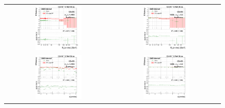 \begin{figure}[bh]
  \begin{center}
    \begin{tabular}{cc}
      \includegraphics[width=0.45\textwidth]{figures/Zprime/2017/ScaleFactor/SameSign/RunF/N-1/g_compare_cut_Et_Barrel_ea_ta_inc_AS_N_1_EcalDriven_PUW_F.png} &
      \includegraphics[width=0.45\textwidth]{figures/Zprime/2017/ScaleFactor/SameSign/RunF/N-1/g_compare_cut_Et_Endcap_ea_ta_inc_AS_N_1_EcalDriven_PUW_F.png} \\
      \includegraphics[width=0.45\textwidth]{figures/Zprime/2017/ScaleFactor/SameSign/RunF/N-1/g_compare_cut_phi_Barrel_ea_ta_inc_AS_N_1_EcalDriven_PUW_F.png} &
      \includegraphics[width=0.45\textwidth]{figures/Zprime/2017/ScaleFactor/SameSign/RunF/N-1/g_compare_cut_phi_Endcap_ea_ta_inc_AS_N_1_EcalDriven_PUW_F.png} \\

\end{tabular}
\end{center}
\end{figure}
